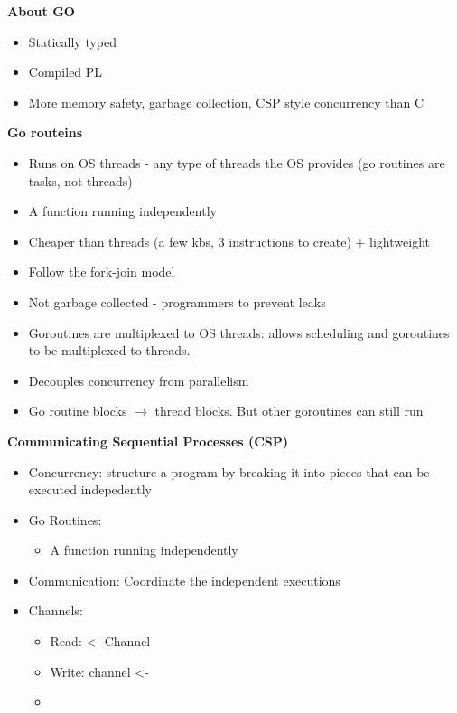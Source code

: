 \documentclass[10pt, landscape]{article}
\begin{document}
\begin{multicols}{4}
\textbf{About GO} \\
\begin{itemize}
    \item Statically typed 
    \item Compiled PL 
    \item More memory safety, garbage collection, CSP style concurrency than C
\end{itemize}

\textbf{Go routeins} \\
\begin{itemize}
    \item Runs on OS threads - any type of threads the OS provides (go routines are tasks, not threads)
    \item A function running independently
    \item Cheaper than threads (a few kbs, 3 instructions to create) + lightweight    
    \item Follow the fork-join model
    \item Not garbage collected - programmers to prevent leaks
    \item Goroutines are multiplexed to OS threads: allows scheduling and goroutines to be multiplexed to threads.
    \item Decouples concurrency from parallelism
    \item Go routine blocks $\rightarrow$ thread blocks. But other goroutines can still run
\end{itemize}

\textbf{Communicating Sequential Processes (CSP)} \\
\begin{itemize}
    \item Concurrency: structure a program by breaking it into pieces that can be executed indepedently
    \item Go Routines:
    \begin{itemize}
        \item A function running independently
    \end{itemize}
    \item Communication: Coordinate the independent executions
    \item Channels:
    \begin{itemize}
        \item Read: <- Channel
        \item Write: channel <-
    \end{itemize}
    \begin{itemize}
        \item 
    \end{itemize}
\end{itemize}


\end{multicols}
\end{document}
